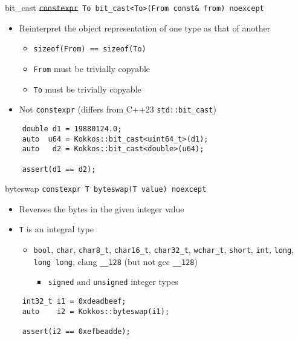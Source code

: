 \begin{frame}[fragile]{bit\_cast}
	\texttt{\st{constexpr} To bit\_cast<To>(From const\& from) noexcept}
	\begin{itemize}
		\item Reinterpret the object representation of one type as that of another
		      \begin{itemize}
		      	\item \texttt{sizeof(From) == sizeof(To)}
		      	\item \texttt{From} must be trivially copyable
		      	\item \texttt{To} must be trivially copyable
		      \end{itemize}
		\item Not \texttt{constexpr} (differs from C++23 \texttt{std::bit\_cast})
	\end{itemize}
	\vfill
	\lstset {language=C++}
	\begin{lstlisting}
    double d1 = 19880124.0;
    auto  u64 = Kokkos::bit_cast<uint64_t>(d1);
    auto   d2 = Kokkos::bit_cast<double>(u64);
    
    assert(d1 == d2);
	\end{lstlisting}	
\end{frame}


\begin{frame}[fragile]{byteswap}
	\texttt{constexpr T byteswap(T value) noexcept}
	\begin{itemize}
		\item Reverses the bytes in the given integer value
		      \vfill
		\item \texttt{T} is an integral type
		      \begin{itemize}
		      	\item \texttt{bool}, \texttt{char}, \texttt{char8\_t}, \texttt{char16\_t}, \texttt{char32\_t}, \texttt{wchar\_t}, \texttt{short}, \texttt{int}, \texttt{long}, \texttt{long long}, clang \texttt{\_\_128} (but not gcc \texttt{\_\_128})
		      	      \begin{itemize}
		      	      	\item \texttt{signed} and \texttt{unsigned} integer types
		      	      \end{itemize}
		      \end{itemize}
	\end{itemize}
	\vfill
	\lstset {language=C++}
	\begin{lstlisting}
    int32_t i1 = 0xdeadbeef;
    auto    i2 = Kokkos::byteswap(i1);
    
    assert(i2 == 0xefbeadde);
	\end{lstlisting}	
\end{frame}


